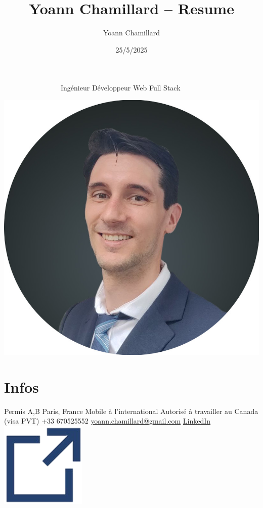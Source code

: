 \documentclass[]{friggeri-cv}
\title{Yoann Chamillard -- Resume}
\author{Yoann Chamillard}
\date{25/5/2025}
\begin{document}
      {~~~~~~~~~~~~~~~~Ingénieur Développeur Web Full Stack}
      {}

\begin{aside}
\hspace{10mm}\includegraphics[scale=0.148]{res/img/Photo_CV.jpg}\section{Infos}
Permis A,B\vspace{2.5mm}
Paris, France\vspace{1.5mm}
Mobile à l'international
Autorisé à travailler au Canada (visa PVT)\vspace{2.5mm}
+33 670525552
\href{mailto:yoann.chamillard@gmail.com}{\small yoann.chamillard@gmail.com}\vspace{2.5mm}
\href{http://fr.linkedin.com/in/yoannchamillard}{LinkedIn\hspace{1.5mm}\includegraphics[scale=0.075]{res/img/hlink.png}}

\end{aside}
\end{document}
